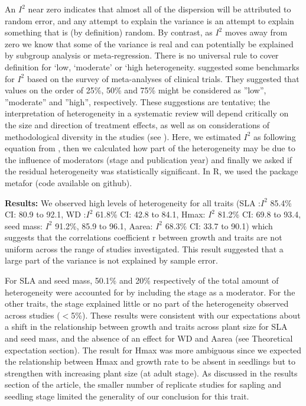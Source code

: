 \documentclass[a4paper,11pt]{article}
\begin{document}
\begin{appendices}
An $I^{2}$ near zero indicates that almost all of the dispersion will be attributed to random error, and any attempt to explain the variance is an attempt to explain something that is (by definition) random. By contrast, as $I^{2}$ moves away from zero we know that some of the variance is real and can potentially be explained by subgroup analysis or meta-regression.
There is no universal rule to cover definition for ‘low, ‘moderate’ or ‘high heterogeneity. \citealt{Higgins:2003hz} suggested some benchmarks for $I^{2}$ based on the survey of meta-analyses of clinical trials. They suggested that values on the order of 25\%, 50\% and 75\% might be considered as ''low'', ''moderate'' and ''high'', respectively. These suggestions are tentative; the interpretation of heterogeneity in a systematic review will depend critically on the size and direction of treatment effects, as well as on considerations of methodological diversity in the studies (see \citealt{Borenstein:2009um}).
Here, we estimated $I^{2}$ as following equation from \citealt{Higgins:2002iq}, then we calculated how part of the heterogeneity may be due to the influence of moderators (stage and publication year) and finally we asked if the residual heterogeneity was statistically significant. In R, we used the package metafor (code available on github).


\textbf{Results:} We observed high levels of heterogeneity for all traits (SLA :$I^{2}$ 85.4\% CI: 80.9 to 92.1, WD :$I^{2}$ 61.8\% CI: 42.8 to 84.1, Hmax: $I^{2}$ 81.2\% CI: 69.8 to 93.4, seed mass: $I^{2}$ 91.2\%, 85.9 to 96.1, Aarea: $I^{2}$ 68.3\% CI: 33.7 to 90.1) which suggests that the correlations coefficient r between growth and traits are not uniform across the range of studies investigated. This result suggested that a large part of the variance is not explained by sample error.

For SLA and seed mass, 50.1\% and 20\% respectively of the total amount of heterogeneity were accounted for by including the stage as a moderator. For the other traits, the stage explained little or no part of the heterogeneity observed across studies ($<$5\%). These results were consistent with our expectations about a shift in the relationship between growth and traits across plant size for SLA and seed mass, and the absence of an effect for WD and Aarea (see Theoretical expectation section). The result for Hmax was more ambiguous since we expected the relationship between Hmax and growth rate to be absent in seedlings but to strengthen with increasing plant size (at adult stage). As discussed in the results section of the article, the smaller number of replicate studies for sapling and seedling stage limited the generality of our conclusion for this trait.


\end{appendices}
\end{document}

